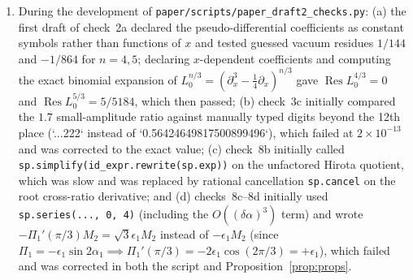 \documentclass[11pt,a4paper]{article}
\newcommand{\scr}[1]{\nolinkurl{#1}}
\newcommand{\Res}{\operatorname{Res}}
\theoremstyle{remark}
\begin{document}
\begin{enumerate}
\item During the development of \scr{paper/scripts/paper_draft2_checks.py}: (a) the first draft of check~2a declared the pseudo-differential coefficients as constant symbols rather than functions of $x$ and tested guessed vacuum residues $1/144$ and $-1/864$ for $n=4,5$; declaring $x$-dependent coefficients and computing the exact binomial expansion of $L_0^{n/3}=(\partial_x^3-\tfrac14\partial_x)^{n/3}$ gave $\Res L_0^{4/3}=0$ and $\Res L_0^{5/3}=5/5184$, which then passed; (b) check~3c initially compared the $1.7$ small-amplitude ratio against manually typed digits beyond the 12th place (`...222` instead of `0.56424649817500899496`), which failed at $2\times10^{-13}$ and was corrected to the exact value; (c) check~8b initially called \texttt{sp.simplify(id\_expr.rewrite(sp.exp))} on the unfactored Hirota quotient, which was slow and was replaced by rational cancellation \texttt{sp.cancel} on the root cross-ratio derivative; and (d) checks~8c--8d initially used \texttt{sp.series(..., 0, 4)} (including the $O((\delta\alpha)^3)$ term) and wrote $-\Pi_1'(\pi/3)M_2=\sqrt3\epsilon_1M_2$ instead of $-\epsilon_1M_2$ (since $\Pi_1=-\epsilon_1\sin2\alpha_1\implies\Pi_1'(\pi/3)=-2\epsilon_1\cos(2\pi/3)=+\epsilon_1$), which failed and was corrected in both the script and Proposition~\ref{prop:props}.

\end{enumerate}
\end{document}
